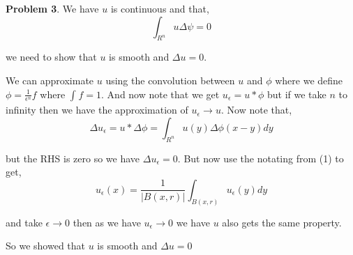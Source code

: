 \documentclass[a4paper]{article}
\begin{document}








\textbf{Problem 3}.
We have $u$ is continuous and that, 
\[
    \int_{R^{n}}^{}  u \Delta \psi = 0
\]

we need to show that $u$ is smooth and $\Delta u = 0$.
\vspace{1em}

We can approximate $u$ using the convolution between $u$ and $\phi$ where we define $\phi = \frac{1}{\epsilon^{n}} f$ where $\int_{}^{}f = 1 $. And now note that we  get $u_{\epsilon} = u * \phi$ but if we take $n$ to infinity then we have the approximation of $u_{\epsilon} \to u$. Now note that, 
\[
    \Delta u_{\epsilon} = u * \Delta \phi = \int_{R^{n}}^{}  u(y) \Delta \phi(x - y) dy
\]

but the RHS is zero so we have $\Delta u_{\epsilon} = 0$. But now use the notating from (1) to get, 
\[
    u_{\epsilon}(x) = \frac{1}{\left | B(x, r)\right |} \int_{B(x, r)}^{}  u_{\epsilon}(y) dy
\]

and take $\epsilon \to 0$ then as we have $u_{\epsilon} \to 0$ we have $u$ also gets the same property.

\vspace{1em}

So we showed that $u$ is smooth and  $\Delta u = 0$
\end{document}
